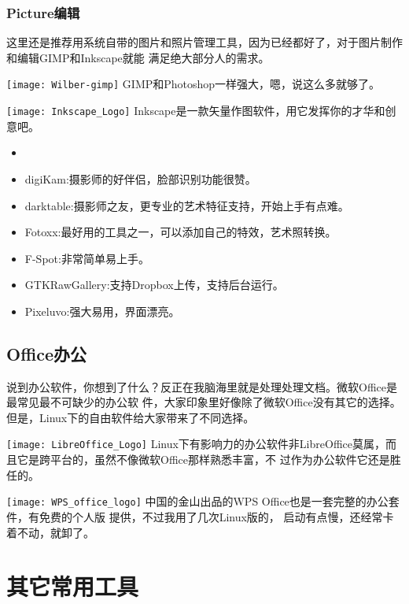 \documentclass[11pt,fleqn]{book} %
\begin{document}
\subsubsection{Picture编辑}
这里还是推荐用系统自带的图片和照片管理工具，因为已经都好了，对于图片制作和编辑GIMP和Inkscape就能
满足绝大部分人的需求。

\texttt{[image: Wilber-gimp]}
GIMP和Photoshop一样强大，嗯，说这么多就够了。

\texttt{[image: Inkscape\_Logo]}
Inkscape是一款矢量作图软件，用它发挥你的才华和创意吧。
\begin{recommendation}
  \begin{itemize}
    \item
    \item digiKam:摄影师的好伴侣，脸部识别功能很赞。
    \item darktable:摄影师之友，更专业的艺术特征支持，开始上手有点难。
    \item Fotoxx:最好用的工具之一，可以添加自己的特效，艺术照转换。
    \item F-Spot:非常简单易上手。
    \item GTKRawGallery:支持Dropbox上传，支持后台运行。
    \item Pixeluvo:强大易用，界面漂亮。
  \end{itemize}
\end{recommendation}
\subsection{Office办公}
说到办公软件，你想到了什么？反正在我脑海里就是处理处理文档。微软Office是最常见最不可缺少的办公软
件，大家印象里好像除了微软Office没有其它的选择。但是，Linux下的自由软件给大家带来了不同选择。

\texttt{[image: LibreOffice\_Logo]}
Linux下有影响力的办公软件非LibreOffice莫属，而且它是跨平台的，虽然不像微软Office那样熟悉丰富，不
过作为办公软件它还是胜任的。

\texttt{[image: WPS\_office\_logo]}
中国的金山出品的WPS Office也是一套完整的办公套件，有免费的个人版 提供，不过我用了几次Linux版的，
启动有点慢，还经常卡着不动，就卸了。

\section{其它常用工具}
\end{document}
